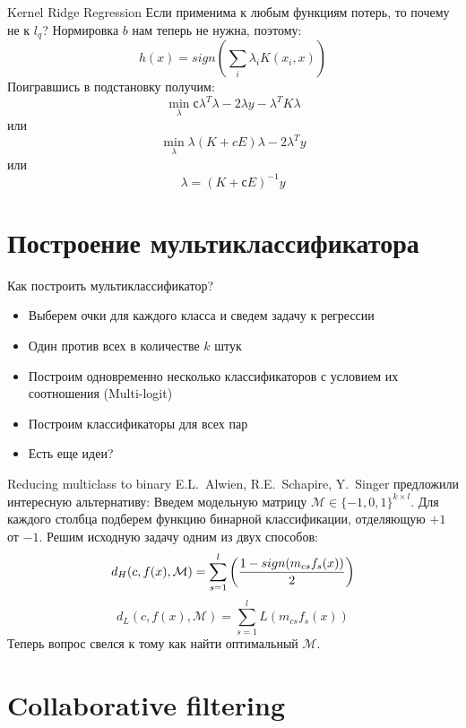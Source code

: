 \documentclass[14pt, fleqn, xcolor={dvipsnames, table}]{beamer}
\begin{document}
\begin{frame}{Kernel Ridge Regression}
\small
Если применима к любым функциям потерь, то почему не к $l_q$? Нормировка $b$ нам теперь не нужна, поэтому:
$$
h(x) = sign \left(\sum_i \lambda_i K(x_i, x)\right)
$$
Поигравшись в подстановку получим:
$$
\min_\lambda с \lambda^T\lambda - 2 \lambda y - \lambda^T K \lambda
$$
или
$$
\min_\lambda \lambda (K + cE) \lambda - 2\lambda^T y
$$
или
$$
\lambda = \left(K + с E\right)^{-1}y
$$
\end{frame}

\section{Построение мультиклассификатора} %
\begin{frame}{Как построить мультиклассификатор?}
\begin{itemize}
  \item Выберем очки для каждого класса и сведем задачу к регрессии
  \item Один против всех в количестве $k$ штук
  \item Построим одновременно несколько классификаторов с условием их соотношения (Multi-logit)
  \item Построим классификаторы для всех пар
  \item Есть еще идеи?
\end{itemize}
\end{frame}

\begin{frame}{Reducing multiclass to binary}
\small
E.L.~Alwien, R.E.~Schapire, Y.~Singer предложили интересную альтернативу:
Введем модельную матрицу $\mathcal{M} \in \{-1,0,1\}^{k\times l}$. Для каждого столбца подберем функцию бинарной классификации, отделяющую $+1$ от $-1$.
Решим исходную задачу одним из двух способов:
$$
d_H(c, f(x), \mathcal{M}) = \sum_{s = 1}^l\left({1 - sign(m_{cs} f_s(x)) \over 2}\right)
$$
$$
d_L(c, f(x), \mathcal{M}) = \sum_{s = 1}^l L(m_{cs} f_s(x))
$$
Теперь вопрос свелся к тому как найти оптимальный $\mathcal{M}$.
\end{frame}

\section{Collaborative filtering}
\end{document}
